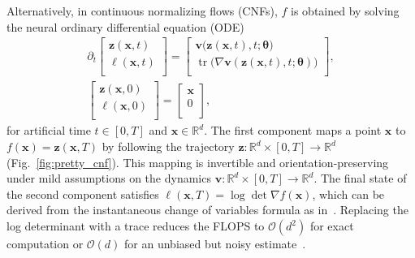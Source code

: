 \documentclass[letterpaper]{article}
\newcommand{\bfth}{\boldsymbol{\theta}}
\newcommand{\bfv}{\mathbf{v}}
\newcommand{\bfx}{\boldsymbol{x}}
\newcommand{\bfz}{\boldsymbol{z}}
\def\tr{\operatorname{tr}}
\newcommand{\R}{\ensuremath{\mathds{R}}}
\newcommand{\bigO}{\ensuremath{\mathcal{O}}}
\begin{document}
		
	Alternatively, in continuous normalizing flows (CNFs), $f$ is obtained by solving the neural ordinary differential equation (ODE)~\cite{chen2018neural,grathwohl2019ffjord} 
	\begin{equation} 
		\begin{split}
		  \label{eq:neural_odes}
		  \partial_t \left[ \begin{array}{c}
		      \bfz(\bfx,t)\\
		      \ell(\bfx,t)\\
		    \end{array} \right]
		    =
		    \left[  \begin{array}{c}
		      \bfv \big(\bfz(\bfx,t), t; \bfth \big) \\
		      \tr \big( \nabla \bfv(\bfz(\bfx,t),t; \bfth) \big) \\
		    \end{array}  \right], \\
		    \left[  \begin{array}{c}
		      \bfz(\bfx,0) \\
		      \ell(\bfx,0) \\
		    \end{array}  \right] = 
		    \left[  \begin{array}{c}
		      \bfx \\
		      0    \\
		    \end{array}  \right],
		\end{split}
	\end{equation} 
	for artificial time $t \in [0,T]$ and $\bfx\in\R^d$.
	The first component maps a point $\bfx$ to $f(\bfx)=\bfz(\bfx,T)$ by following the trajectory $\bfz \colon \R^d \times [0,T] \to \R^d$ (Fig.~\ref{fig:pretty_cnf}).
	This mapping is invertible and orientation-preserving under mild assumptions on the dynamics $\bfv \colon \R^d \times [0,T] \to \R^d$.
	The final state of the second component satisfies $\ell(\bfx,T)=\log\det\nabla f(\bfx)$, which can be derived from the instantaneous change of variables formula as in~\citet{chen2018neural}. 
	Replacing the log determinant with a trace reduces the FLOPS to $\bigO(d^2)$ for exact computation or $\bigO(d)$ for an unbiased but noisy estimate~\cite{zhang2018monge,grathwohl2019ffjord,finlay2020train}. 
\end{document}
